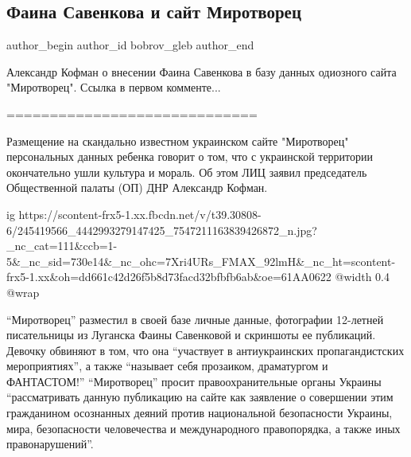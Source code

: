  
 
 
 
 
 
\subsection{Фаина Савенкова и сайт Миротворец}
\label{sec:16_10_2021.fb.bobrov_gleb.1.savenkova_sajt_mirotvorec}
 
\ifcmt
 author_begin
   author_id bobrov_gleb
 author_end
\fi

Александр Кофман о внесении Фаина Савенкова в базу данных одиозного сайта
"Миротворец". Ссылка в первом комменте...

=============================

Размещение на скандально известном украинском сайте "Миротворец" персональных
данных ребенка говорит о том, что с украинской территории окончательно ушли
культура и мораль. Об этом ЛИЦ заявил председатель Общественной палаты (ОП) ДНР
Александр Кофман.

\ifcmt
  ig https://scontent-frx5-1.xx.fbcdn.net/v/t39.30808-6/245419566_4442993279147425_7547211163839426872_n.jpg?_nc_cat=111&ccb=1-5&_nc_sid=730e14&_nc_ohc=7Xri4URs_FMAX_92lmH&_nc_ht=scontent-frx5-1.xx&oh=dd661c42d26f5b8d73facd32bfbfb6ab&oe=61AA0622
  @width 0.4
  @wrap 
\fi

\enquote{Миротворец} разместил в своей базе личные данные, фотографии 12-летней
писательницы из Луганска Фаины Савенковой и скриншоты ее публикаций. Девочку
обвиняют в том, что она \enquote{участвует в антиукраинских пропагандистских
мероприятиях}, а также \enquote{называет себя прозаиком, драматургом и ФАНТАСТОМ!}
\enquote{Миротворец} просит правоохранительные органы Украины \enquote{рассматривать данную
публикацию на сайте как заявление о совершении этим гражданином осознанных
деяний против национальной безопасности Украины, мира, безопасности
человечества и международного правопорядка, а также иных правонарушений}.

